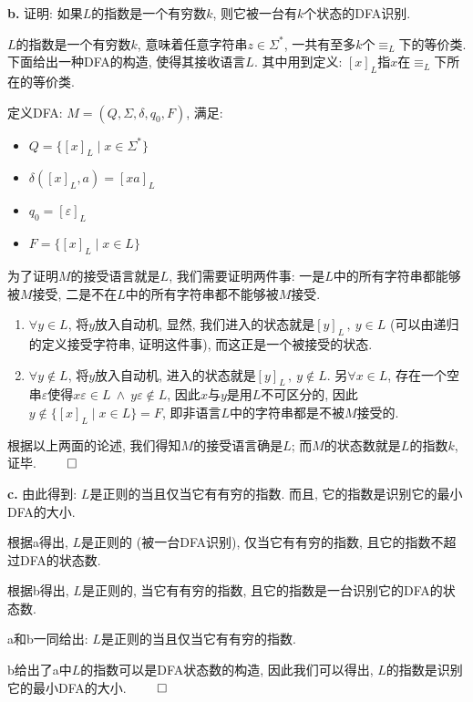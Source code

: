 \documentclass[UTF8]{report}
\newcommand{\problem}[1]{{\setlength{\parskip}{10pt}\noindent \bf{#1}}}
\renewenvironment{proof}{{\setlength{\parskip}{7pt}\noindent\hskip 2em \bf 证明 \quad}}{\hfill$\qed$\par}
\begin{document}
\problem{b.} 证明: 如果$L$的指数是一个有穷数$k$, 则它被一台有$k$个状态的DFA识别.

\begin{proof}
    $L$的指数是一个有穷数$k$, 意味着任意字符串$z\in\Sigma^*$, 一共有至多$k$个$\equiv_L$下的等价类. 下面给出一种DFA的构造, 使得其接收语言$L$. 其中用到定义: $[x]_L$指$x$在$\equiv_L$下所在的等价类.

    定义DFA: $M = (Q, \Sigma, \delta, q_0, F)$, 满足:
    \begin{itemize}
        \item $Q = \{ [x]_L \mid x\in\Sigma^*\}$
        \item $\delta([x]_L, a) = [xa]_L$
        \item $q_0 = [\varepsilon]_L$
        \item $F = \{ [x]_L \mid x\in L \}$
    \end{itemize}

    为了证明$M$的接受语言就是$L$, 我们需要证明两件事: 一是$L$中的所有字符串都能够被$M$接受, 二是不在$L$中的所有字符串都不能够被$M$接受.

    \begin{enumerate}
        \item $\forall y\in L$, 将$y$放入自动机, 显然, 我们进入的状态就是$[y]_L\,,\ y\in L$ (可以由递归的定义接受字符串, 证明这件事), 而这正是一个被接受的状态.
        \item $\forall y\notin L$, 将$y$放入自动机, 进入的状态就是$[y]_L\,,\ y\notin L$. 另$\forall x\in L$, 存在一个空串$\varepsilon$使得$x\varepsilon \in L\ \land\ y\varepsilon \notin L$, 因此$x$与$y$是用$L$不可区分的, 因此$y \notin \{ [x]_L \mid x\in L \} = F$, 即非语言$L$中的字符串都是不被$M$接受的.
    \end{enumerate}
    
    根据以上两面的论述, 我们得知$M$的接受语言确是$L$; 而$M$的状态数就是$L$的指数$k$, 证毕.
\end{proof}

\problem{c.} 由此得到: $L$是正则的当且仅当它有有穷的指数. 而且, 它的指数是识别它的最小DFA的大小.

\begin{proof}
    根据a得出, $L$是正则的 (被一台DFA识别), 仅当它有有穷的指数, 且它的指数不超过DFA的状态数.

    根据b得出, $L$是正则的, 当它有有穷的指数, 且它的指数是一台识别它的DFA的状态数.

    a和b一同给出: $L$是正则的当且仅当它有有穷的指数. 

    b给出了a中$L$的指数可以是DFA状态数的构造, 因此我们可以得出, $L$的指数是识别它的最小DFA的大小.
\end{proof}
\end{document}
